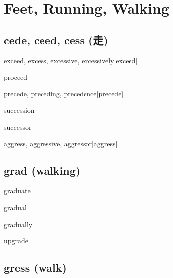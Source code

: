\chapter{Feet, Running, Walking}

\section{cede, ceed, cess (走)}

\begin{RefWord}{exceed, excess, excessive, excessively}[exceed]
\end{RefWord}

\begin{RefWord}{proceed}
\end{RefWord}

\begin{RefWord}{precede, preceding, precedence}[precede]
\end{RefWord}

\begin{RefWord}{succession}
\end{RefWord}

\begin{RefWord}{successor}
\end{RefWord}

\begin{RefWord}{aggress, aggressive, aggressor}[aggress]
\end{RefWord}

\section{grad (walking)}

\begin{RefWord}{graduate}
\end{RefWord}

\begin{RefWord}{gradual}
\end{RefWord}

\begin{RefWord}{gradually}
\end{RefWord}

\begin{RefWord}{upgrade}
\end{RefWord}

\section{gress (walk)}

